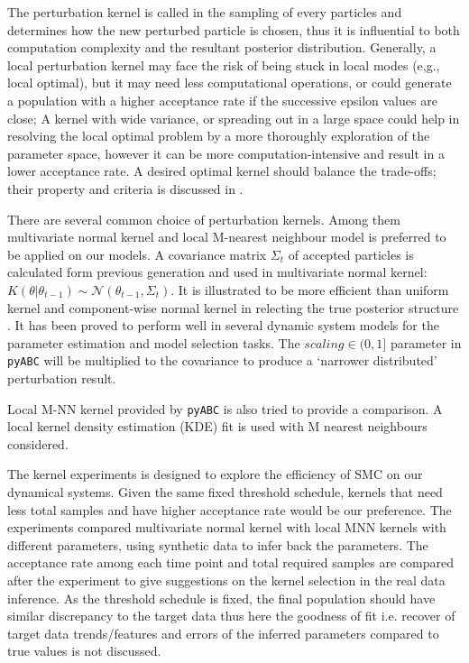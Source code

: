 \documentclass[12pt,a4paper]{report}
\begin{document}

The perturbation kernel is called in the sampling of every particles and determines how the new perturbed particle is chosen, thus it is influential to both computation complexity and the resultant posterior distribution. Generally, a local perturbation kernel may face the risk of being stuck in local modes (e,g., local optimal), but it may need less computational operations, or could generate a population with a higher acceptance rate if the successive epsilon values are close; A kernel with wide variance, or spreading out in a large space could help in resolving the local optimal problem by a more thoroughly exploration of the parameter space, however it can be more computation-intensive and result in a lower acceptance rate. A desired optimal kernel should balance the trade-offs; their property and criteria is discussed in \cite{ref:kernel}.

There are several common choice of perturbation kernels. Among them multivariate normal kernel and local M-nearest neighbour model is preferred to be applied on our models. A covariance matrix $\Sigma_t$ of accepted particles is calculated form previous generation and used in multivariate normal kernel: $K(\theta|\theta_{t-1})\sim\mathcal{N}(\theta_{t-1}, \Sigma_t)$. It is illustrated to be more efficient than uniform kernel and component-wise normal kernel in relecting the true posterior structure \cite{ref:kernel}. It has been proved to perform well in several dynamic system models \cite{ref:abcsysbio, ref:compare, ref:disease} for the parameter estimation and model selection tasks. The $scaling\in(0,1]$ parameter in \verb|pyABC| will be multiplied to the covariance to produce a `narrower distributed' perturbation result.

Local M-NN kernel provided by \verb|pyABC| is also tried to provide a comparison. A local kernel density estimation (KDE) fit is used with M nearest neighbours considered.

The kernel experiments is designed to explore the efficiency of SMC on our dynamical systems. Given the same fixed threshold schedule, kernels that need less total samples and have higher acceptance rate would be our preference. The experiments compared multivariate normal kernel with local MNN kernels with different parameters, using synthetic data to infer back the parameters. The acceptance rate among each time point and total required samples are compared after the experiment to give suggestions on the kernel selection in the real data inference. As the threshold schedule is fixed, the final population should have similar discrepancy to the target data thus here the goodness of fit i.e. recover of target data trends/features and errors of the inferred parameters compared to true values is not discussed.
\end{document}
